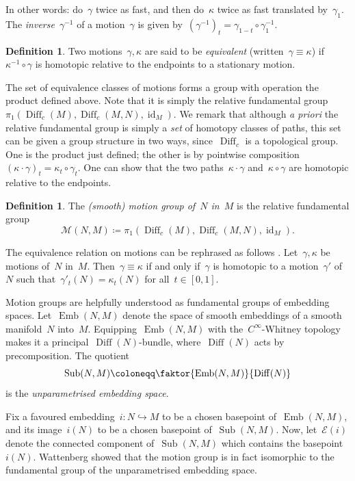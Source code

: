 \documentclass{amsart}
\theoremstyle{definition}
\theoremstyle{definition}
\theoremstyle{definition}
\theoremstyle{definition}
\newtheorem{definition}[theorem]{Definition}
\DeclareMathOperator{\id}{id}
\newcommand{\calE}{\mathcal{E}}
\newcommand{\motion}[2]{\mathcal{M}\left({#1}, {#2}\right)} %
\newcommand{\diff}{\operatorname{Diff}} %
\newcommand{\emb}{\operatorname{Emb}} %
\newcommand{\sub}{\operatorname{Sub}} %
\begin{document}
In other words: do~$\gamma$ twice as fast, and then do~$\kappa$ twice as fast translated by~$\gamma_1$. The \emph{inverse}~$\gamma^{-1}$ of a motion~$\gamma$ is given by~$(\gamma^{-1})_t = \gamma_{1-t} \circ \gamma_1^{-1}$.


\begin{definition}\label{def:equivalent_motions}
Two motions~$\gamma, \kappa$ are said to be \emph{equivalent} (written~$\gamma \equiv \kappa$) if~$\kappa^{-1} \circ \gamma$ is homotopic relative to the endpoints to a stationary motion. 
\end{definition}

The set of equivalence classes of motions forms a group with operation the product defined above. Note that it is simply the relative fundamental group~$\pi_1 \left( \diff_c(M), \diff_c(M, N), \id_M \right)$. We remark that although \emph{a priori} the relative fundamental group is simply a \emph{set} of homotopy classes of paths, this set can be given a group structure in two ways, since~$\diff_c$ is a topological group. One is the product just defined; the other is by pointwise composition~$(\kappa \cdot \gamma)_t = \kappa_t \circ \gamma_t$. One can show that the two paths~$\kappa \cdot \gamma$ and~$\kappa \circ \gamma$ are homotopic relative to the endpoints. 

\begin{definition}\label{def:smooth motion group}
    The \emph{(smooth) motion group of~$N$ in~$M$} is the relative fundamental group 
    \[\motion{N}{M} \coloneqq \pi_1 \left( \diff_c(M), \diff_c(M, N), \id_M \right).\]
\end{definition}

The equivalence relation on motions can be rephrased as follows \cite[Proposition 2.8]{Goldsmith}. Let~$\gamma, \kappa$ be motions of~$N$ in~$M$. Then~$\gamma \equiv \kappa$ if and only if~$\gamma$ is homotopic to a motion~$\gamma'$ of~$N$ such that~$\gamma'_t(N) = \kappa_t(N)$ for all~$t \in [0, 1]$.


Motion groups are helpfully understood as fundamental groups of embedding spaces. Let~$\emb(N, M)$ denote the space of smooth embeddings of a smooth manifold~$N$ into~$M$. Equipping~$\emb(N, M)$ with the~$C^\infty$-Whitney topology makes it a principal~$\diff(N)$-bundle, where~$\diff(N)$ acts by precomposition. The quotient 
\[\sub(N, M) \coloneqq \faktor{\emb(N, M)}{\diff(N)}\]
is the \emph{unparametrised embedding space}. 

Fix a favoured embedding~$i \colon N \hookrightarrow M$ to be a chosen basepoint of~$\emb(N, M)$, and its image~$i(N)$ to be a chosen basepoint of~$\sub(N, M)$. Now, let~$\calE(i)$ denote the connected component of~$\sub(N, M)$ which contains the basepoint~$i(N)$. Wattenberg \cite{WattenbergSmoothMotionsUnlink72} showed that the motion group is in fact isomorphic to the fundamental group of the unparametrised embedding space.
\end{document}
